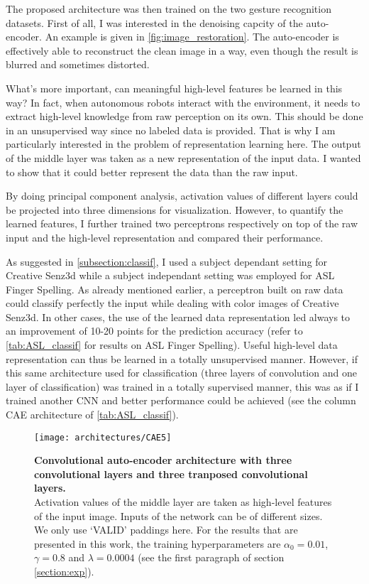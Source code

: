 The proposed architecture was then trained on the two gesture recognition
datasets. First of all, I was interested in the denoising capcity of
the auto-encoder. An example is given in \autoref{fig:image_restoration}.
The auto-encoder is effectively able to reconstruct the clean image in
a way, even though the result is blurred and sometimes distorted.

What's more important, can meaningful high-level features be
learned in this way? 
In fact, when autonomous robots interact with the environment, it needs
to extract high-level knowledge from raw perception on its own.
This should be done in an unsupervised way since no labeled data
is provided.
That is why I am particularly interested in the problem of representation
learning here. The output of the middle layer was taken as a new
representation of the input data.
I wanted to show that it could better represent the data than the raw input.

By doing principal component analysis, activation values of different
layers could be projected into three dimensions for visualization.
However, to quantify the learned features, I further trained two perceptrons
respectively on top of the raw input and the high-level representation
and compared their performance.

As suggested in \ref{subsection:classif}, I used a subject dependant setting
for Creative Senz3d while a subject independant setting was employed
for ASL Finger Spelling. As already mentioned earlier, a perceptron built
on raw data could classify perfectly the input while dealing with color
images of Creative Senz3d. In other cases, the use of the learned
data representation led always to an improvement of 10-20 points for
the prediction accuracy (refer to \autoref{tab:ASL_classif}
for results on ASL Finger Spelling). Useful high-level data representation
can thus be learned in a totally unsupervised manner.
However, if this same architecture used for classification (three layers
of convolution and one layer of classification) was trained in a
totally supervised manner, this was as if I trained another CNN and
better performance could be achieved (see the column CAE architecture
of \autoref{tab:ASL_classif}).

\begin{figure}[H]
  \centering
  \texttt{[image: architectures/CAE5]}
  \caption{%
    \textbf{Convolutional auto-encoder architecture with 
      three convolutional layers and three tranposed convolutional
      layers.}\\[0.1em]
    Activation values of the middle layer are taken as 
      high-level features of the input image. Inputs of the network
      can be of different sizes. We only use `VALID' paddings here.
      For the results that are presented in this work, the training
      hyperparameters are $\alpha_0 = 0.01$, $\gamma = 0.8$ and
      $\lambda = 0.0004$ (see the first paragraph of section
      \ref{section:exp}).
      }
  \label{fig:CAE5}
\end{figure}

